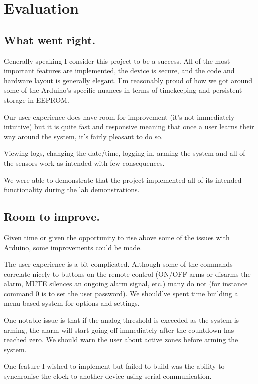 \documentclass[a4paper,11pt]{article}
\theoremstyle{mytheor}
\begin{document}
\section{Evaluation}

\subsection{What went right.}

Generally speaking I consider this project to be a success. All of the most important features are implemented, the device is secure, and the code and hardware layout is generally elegant. I'm reasonably proud of how we got around some of the Arduino's specific nuances in terms of timekeeping and persistent storage in EEPROM.

Our user experience does have room for improvement (it's not immediately intuitive) but it is quite fast and responsive meaning that once a user learns their way around the system, it's fairly pleasant to do so.

Viewing logs, changing the date/time, logging in, arming the system and all of the sensors work as intended with few consequences.

We were able to demonstrate that the project implemented all of its intended functionality during the lab demonstrations.

\subsection{Room to improve.}

Given time or given the opportunity to rise above some of the issues with Arduino, some improvements could be made.

The user experience is a bit complicated. Although some of the commands correlate nicely to buttons on the remote control (ON/OFF arms or disarms the alarm, MUTE silences an ongoing alarm signal, etc.) many do not (for instance command 0 is to set the user password). We should've spent time building a menu based system for options and settings.

One notable issue is that if the analog threshold is exceeded as the system is arming, the alarm will start going off immediately after the countdown has reached zero. We should warn the user about active zones before arming the system.

One feature I wished to implement but failed to build was the ability to synchronise the clock to another device using serial communication.
\end{document}
